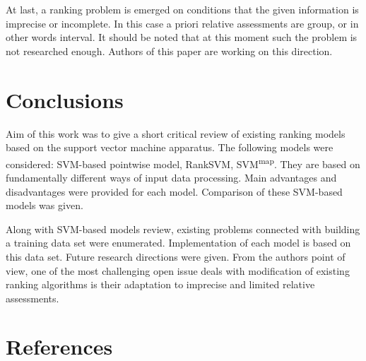 \documentclass[12pt,a4paper,oneside]{article}
\begin{document}
\par
At last, a ranking problem is emerged on conditions that the given information is imprecise or incomplete. 
In this case a priori relative assessments are group, or in other words interval. 
It should be noted that at this moment such the problem is not researched enough. 
Authors of this paper are working on this direction.


\section{Conclusions}
\label{sec:conclusions}

\par
Aim of this work was to give a short critical review of existing ranking models based on the support vector machine apparatus. 
The following models were considered: SVM-based pointwise model, RankSVM, SVM\textsuperscript{map}. 
They are based on fundamentally different ways of input data processing. 
Main advantages and disadvantages were provided for each model. 
Comparison of these SVM-based models was given.

\par
Along with SVM-based models review, existing problems connected with building a training data set were enumerated. 
Implementation of each model is based on this data set. Future research directions were given. 
From the authors point of view, one of the most challenging open issue deals with modification of existing ranking algorithms is their adaptation to imprecise and limited relative assessments.


\section*{References}
\label{sec:references}
\end{document}
